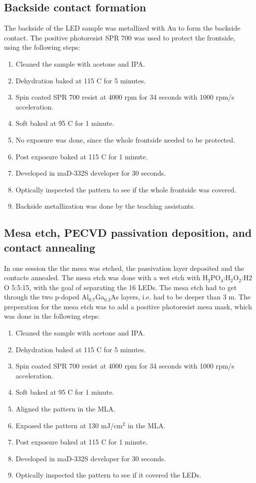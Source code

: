 \subsection{Backside contact formation}
\label{methods:backside_metallization}
The backside of the LED sample was metallized with Au to form the backside contact.
The positive photoresist SPR 700 was used to protect the frontside, using the following steps:
\begin{enumerate}
    \item Cleaned the sample with acetone and IPA.
    \item Dehydration baked at 115 \textdegree C for 5 minutes.
    \item Spin coated SPR 700 resist at 4000 rpm for 34 seconds with 1000 rpm/s acceleration.
    \item Soft baked at 95 \textdegree C for 1 minute.
    \item No exposure was done, since the whole frontside needed to be protected.
    \item Post exposure baked at 115 \textdegree C for 1 minute.
    \item Developed in maD-332S developer for 30 seconds.
    \item Optically inspected the pattern to see if the whole frontside was covered.
    \item Backside metallization was done by the teaching assistants.
\end{enumerate}


\subsection{Mesa etch, PECVD passivation deposition, and contact annealing}
\label{methods:PECVD}
In one session the the mesa was etched, the passivation layer deposited and the contacts annealed.
The mesa etch was done with a wet etch with H$_3$PO$_4$:H$_2$O$_2$:H$2$O 5:5:15, with the goal of separating the 16 LEDs.
The mesa etch had to get through the two p-doped Al$_{0.7}$Ga$_{0.3}$As layers, i.e. had to be deeper than 3 \textmu m.
The preperation for the mesa etch was to add a positive photoresist mesa mask, which was done in the following steps:

\begin{enumerate}
    \item Cleaned the sample with acetone and IPA.
    \item Dehydration baked at 115 \textdegree C for 5 minutes.
    \item Spin coated SPR 700 resist at 4000 rpm for 34 seconds with 1000 rpm/s acceleration.
    \item Soft baked at 95 \textdegree C for 1 minute.
    \item Aligned the pattern in the MLA.
    \item Exposed the pattern at 130 mJ/cm$^2$ in the MLA.
    \item Post exposure baked at 115 \textdegree C for 1 minute.
    \item Developed in maD-332S developer for 30 seconds.
    \item Optically inspected the pattern to see if it covered the LEDs.
\end{enumerate}

